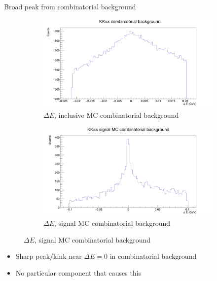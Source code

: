 \documentclass{beamer}
\begin{document}
\begin{frame}{Broad peak from combinatorial background}
  \begin{figure}
    \centering
    \begin{subfigure}{0.5\textwidth}
      \centering
      \includegraphics[width=\textwidth]{KKpipiDeltaECombinatorial.png}
      \caption{$\Delta E$, inclusive MC combinatorial background}
    \end{subfigure}%
    \begin{subfigure}{0.5\textwidth}
      \centering
      \includegraphics[width=\textwidth]{KKpipiDeltaECombinatorialSignalMC.png}
      \caption{$\Delta E$, signal MC combinatorial background}
    \end{subfigure}
  \end{figure}
  \begin{itemize}
    \item{Sharp peak/kink near $\Delta E = 0$ in combinatorial background}
    \item{No particular component that causes this}
  \end{itemize}
\end{frame}
\end{document}
